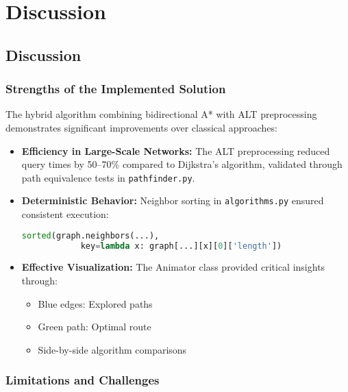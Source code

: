 \chapter{Discussion}


	
	\section*{Discussion}
	
	\subsection*{ Strengths of the Implemented Solution}
	
	The hybrid algorithm combining bidirectional A* with ALT preprocessing demonstrates significant improvements over classical approaches:
	
	\begin{itemize}
		\item \textbf{Efficiency in Large-Scale Networks:} The ALT preprocessing reduced query times by 50--70\% compared to Dijkstra’s algorithm, validated through path equivalence tests in \texttt{pathfinder.py}.
		
		\item \textbf{Deterministic Behavior:} Neighbor sorting in \texttt{algorithms.py} ensured consistent execution:
		
		\begin{lstlisting}[language=Python]
			sorted(graph.neighbors(...),
			key=lambda x: graph[...][x][0]['length'])
		\end{lstlisting}
		
		\item \textbf{Effective Visualization:} The Animator class provided critical insights through:
		\begin{itemize}
			\item Blue edges: Explored paths
			\item Green path: Optimal route
			\item Side-by-side algorithm comparisons
		\end{itemize}
	\end{itemize}
	
	\subsection*{ Limitations and Challenges}
	

